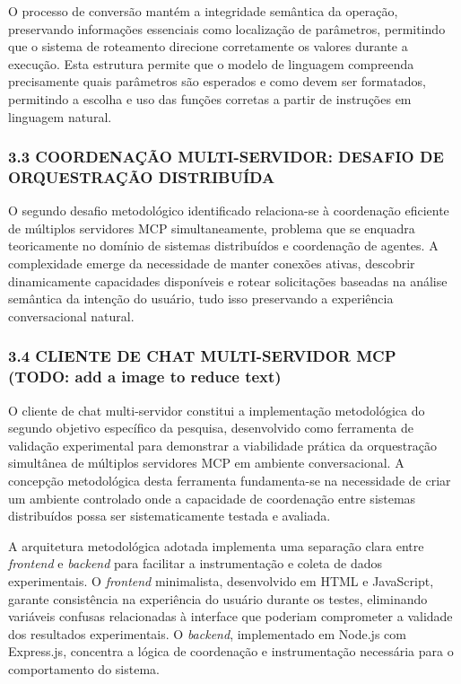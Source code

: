 \documentclass[
]{article}
\begin{document}
O processo de conversão mantém a integridade semântica da operação,
preservando informações essenciais como localização de parâmetros,
permitindo que o sistema de roteamento direcione corretamente os valores
durante a execução. Esta estrutura permite que o modelo de linguagem
compreenda precisamente quais parâmetros são esperados e como devem ser
formatados, permitindo a escolha e uso das funções corretas a partir de
instruções em linguagem natural.

\subsubsection{3.3 COORDENAÇÃO MULTI-SERVIDOR: DESAFIO DE ORQUESTRAÇÃO
DISTRIBUÍDA}\label{coordenauxe7uxe3o-multi-servidor-desafio-de-orquestrauxe7uxe3o-distribuuxedda}

O segundo desafio metodológico identificado relaciona-se à coordenação
eficiente de múltiplos servidores MCP simultaneamente, problema que se
enquadra teoricamente no domínio de sistemas distribuídos e coordenação
de agentes. A complexidade emerge da necessidade de manter conexões
ativas, descobrir dinamicamente capacidades disponíveis e rotear
solicitações baseadas na análise semântica da intenção do usuário, tudo
isso preservando a experiência conversacional natural.

\subsubsection{3.4 CLIENTE DE CHAT MULTI-SERVIDOR MCP (TODO: add a image
to reduce
text)}\label{cliente-de-chat-multi-servidor-mcp-todo-add-a-image-to-reduce-text}

O cliente de chat multi-servidor constitui a implementação metodológica
do segundo objetivo específico da pesquisa, desenvolvido como ferramenta
de validação experimental para demonstrar a viabilidade prática da
orquestração simultânea de múltiplos servidores MCP em ambiente
conversacional. A concepção metodológica desta ferramenta fundamenta-se
na necessidade de criar um ambiente controlado onde a capacidade de
coordenação entre sistemas distribuídos possa ser sistematicamente
testada e avaliada.

A arquitetura metodológica adotada implementa uma separação clara entre
\emph{frontend} e \emph{backend} para facilitar a instrumentação e
coleta de dados experimentais. O \emph{frontend} minimalista,
desenvolvido em HTML e JavaScript, garante consistência na experiência
do usuário durante os testes, eliminando variáveis confusas relacionadas
à interface que poderiam comprometer a validade dos resultados
experimentais. O \emph{backend}, implementado em Node.js com Express.js,
concentra a lógica de coordenação e instrumentação necessária para o
comportamento do sistema.
\end{document}
